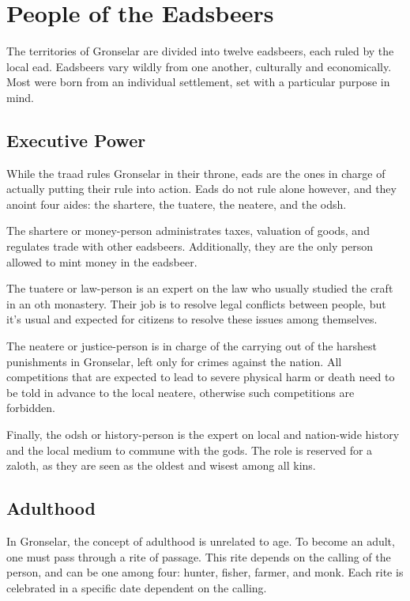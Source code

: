 \section{People of the Eadsbeers}
The territories of Gronselar are divided into twelve eadsbeers, each ruled by the local ead.
Eadsbeers vary wildly from one another, culturally and economically.
Most were born from an individual settlement, set with a particular purpose in mind.

\subsection*{Executive Power}
While the traad rules Gronselar in their throne, eads are the ones in charge of actually putting their rule into action.
Eads do not rule alone however, and they anoint four aides: the shartere, the tuatere, the neatere, and the odsh.

The shartere or money-person administrates taxes, valuation of goods, and regulates trade with other eadsbeers.
Additionally, they are the only person allowed to mint money in the eadsbeer.

The tuatere or law-person is an expert on the law who usually studied the craft in an oth monastery.
Their job is to resolve legal conflicts between people, but it's usual and expected for citizens to resolve these issues among themselves.

The neatere or justice-person is in charge of the carrying out of the harshest punishments in Gronselar, left only for crimes against the nation.
All competitions that are expected to lead to severe physical harm or death need to be told in advance to the local neatere, otherwise such competitions are forbidden.

Finally, the odsh or history-person is the expert on local and nation-wide history and the local medium to commune with the gods.
The role is reserved for a zaloth, as they are seen as the oldest and wisest among all kins.

\subsection*{Adulthood}
In Gronselar, the concept of adulthood is unrelated to age.
To become an adult, one must pass through a rite of passage.
This rite depends on the calling of the person, and can be one among four: hunter, fisher, farmer, and monk.
Each rite is celebrated in a specific date dependent on the calling.

